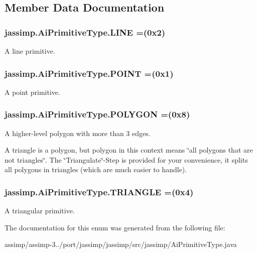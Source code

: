 \subsection{Member Data Documentation}
\hypertarget{enumjassimp_1_1_ai_primitive_type_a3ea249fd0e9fccf25ab4d7f5639dabe8}{
\subsubsection[{L\+I\+N\+E}]{\setlength{\rightskip}{0pt plus 5cm}jassimp.\+Ai\+Primitive\+Type.\+L\+I\+N\+E =(0x2)}}\label{enumjassimp_1_1_ai_primitive_type_a3ea249fd0e9fccf25ab4d7f5639dabe8}
A line primitive. \hypertarget{enumjassimp_1_1_ai_primitive_type_abb7d44dafb7ac7521d817f164b4391ed}{
\subsubsection[{P\+O\+I\+N\+T}]{\setlength{\rightskip}{0pt plus 5cm}jassimp.\+Ai\+Primitive\+Type.\+P\+O\+I\+N\+T =(0x1)}}\label{enumjassimp_1_1_ai_primitive_type_abb7d44dafb7ac7521d817f164b4391ed}
A point primitive. \hypertarget{enumjassimp_1_1_ai_primitive_type_a7a7e0a1a22ee3856ac23288c51ba53b5}{
\subsubsection[{P\+O\+L\+Y\+G\+O\+N}]{\setlength{\rightskip}{0pt plus 5cm}jassimp.\+Ai\+Primitive\+Type.\+P\+O\+L\+Y\+G\+O\+N =(0x8)}}\label{enumjassimp_1_1_ai_primitive_type_a7a7e0a1a22ee3856ac23288c51ba53b5}
A higher-\/level polygon with more than 3 edges.

A triangle is a polygon, but polygon in this context means \char`\"{}all polygons that are not triangles\char`\"{}. The \char`\"{}\+Triangulate\char`\"{}-\/\+Step is provided for your convenience, it splits all polygons in triangles (which are much easier to handle). \hypertarget{enumjassimp_1_1_ai_primitive_type_ad4e02dac72e2e204662d9cdc30795e38}{
\subsubsection[{T\+R\+I\+A\+N\+G\+L\+E}]{\setlength{\rightskip}{0pt plus 5cm}jassimp.\+Ai\+Primitive\+Type.\+T\+R\+I\+A\+N\+G\+L\+E =(0x4)}}\label{enumjassimp_1_1_ai_primitive_type_ad4e02dac72e2e204662d9cdc30795e38}
A triangular primitive. 

The documentation for this enum was generated from the following file\+:\begin{DoxyCompactItemize}
\item 
assimp/assimp-\/3../port/jassimp/jassimp/src/jassimp/Ai\+Primitive\+Type.\+java\end{DoxyCompactItemize}
